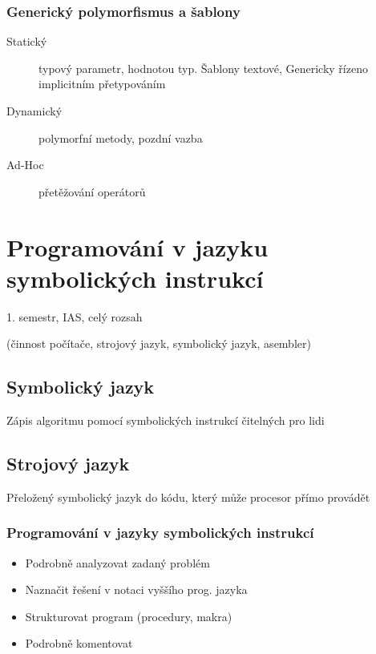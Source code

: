 \documentclass[a4wide]{report}
\begin{document}
\subsection{Generický polymorfismus a šablony}
\begin{description} 
	\item[Statický] typový parametr, hodnotou typ. Šablony textové, Genericky řízeno implicitním přetypováním
	\item[Dynamický] polymorfní metody, pozdní vazba
	\item[Ad-Hoc] přetěžování operátorů
\end{description}





























\chapter{Programování v jazyku symbolických instrukcí} \label{cha:37}

1. semestr, IAS, celý rozsah

(činnost počítače, strojový jazyk, symbolický jazyk, asembler)

\section{Symbolický jazyk}

Zápis algoritmu pomocí symbolických instrukcí čitelných pro lidi

\section{Strojový jazyk}

Přeložený symbolický jazyk do kódu, který může procesor přímo provádět

\subsection{Programování v jazyky symbolických instrukcí}
\begin{itemize}
	\item Podrobně analyzovat zadaný problém
	\item Naznačit řešení v notaci vyššího prog. jazyka
	\item Strukturovat program (procedury, makra)
	\item Podrobně komentovat
\end{itemize}
\end{document}
